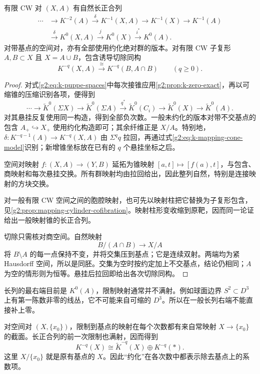 \begin{theorem}\label{g2:thm:k-long-exact}
	有限 CW 对 \((X,A)\) 有自然长正合列
	\begin{equation}\label{g2:eq:k-long-exact}
	\begin{aligned}
		\cdots&\longrightarrow K^{-2}(A)\xrightarrow{\delta}K^{-1}(X,A)
		\longrightarrow K^{-1}(X)\longrightarrow K^{-1}(A)\\
		&\xrightarrow{\delta}K^0(X,A)\xrightarrow{j}K^0(X)
		\xrightarrow{i^*}K^0(A).
	\end{aligned}
	\end{equation}
	对带基点的空间对，亦有全部使用约化绝对群的版本。对有限 CW 子复形 \(A,B\subset X\) 且 \(X=A\cup B\)，包含诱导切除同构
	\[
		K^{-q}(X,A)\xrightarrow{\ \cong\ }K^{-q}(B,A\cap B)
		\qquad(q\ge0).
	\]
\end{theorem}
\begin{proof}
	对式\eqref{g2:eq:k-puppe-spaces}中每次接锥应用\cref{g2:prop:k-zero-exact}，再以可缩锥的压缩识别各项，便得到
	\[
		\cdots\longrightarrow\widetilde K^0(\Sigma X)
		\longrightarrow\widetilde K^0(\Sigma A)
		\xrightarrow{q^*}\widetilde K^0(C_i)
		\longrightarrow\widetilde K^0(X)\longrightarrow\widetilde K^0(A).
	\]
	对其悬挂反复使用同一构造，得到全部负次数。一般未约化的版本对带不交基点的包含 \(A_+\hookrightarrow X_+\) 使用约化构造即可；其余纤维正是 \(X/A\)。特别地，\(\delta:K^{-q-1}(A)\to K^{-q}(X,A)\) 由 \(\Sigma^q q\) 拉回，再通过式\eqref{g2:eq:k-mapping-cone-model}识别；新增锥坐标放在已有的 \(q\) 个悬挂坐标之后。

	空间对映射 \(f:(X,A)\to(Y,B)\) 延拓为锥映射 \([a,t]\mapsto[f(a),t]\)，与包含、商映射和每次悬挂交换。所有群映射均由拉回给出，因此整列自然，特别是连接映射的方块交换。

	对一般有限 CW 空间之间的胞腔映射，也可先以映射柱把它替换为子复形包含，见\cref{g2:prop:mapping-cylinder-cofibration}。映射柱形变收缩到原靶，因而同一论证给出一般映射锥的长正合列。

	切除只需核对商空间。自然映射
	\[
		B/(A\cap B)\longrightarrow X/A
	\]
	将 \(B\setminus A\) 的每一点保持不变，并将交集压到基点；它是连续双射。两端均为紧 Hausdorff 空间，所以是同胚。交集为空时按约定加上不交基点，结论仍相同；\(A\) 为空的情形则为恒等。悬挂后拉回即给出各次切除同构。
\end{proof}

长列的最右端目前是 \(K^0(A)\)，限制映射通常并不满射。例如球面边界 \(S^2\subset D^3\) 上有第一陈数非零的线丛，它不可能来自可缩的 \(D^3\)。所以在一般长列右端不能直接补上零。

对空间对 \((X,\{x_0\})\)，限制到基点的映射在每个次数都有来自常映射 \(X\to\{x_0\}\) 的截面。长正合列的前一次限制也满射，因而得到
\[
	K^{-q}(X)\cong\widetilde K^{-q}(X)\oplus K^{-q}(*).
\]
这里 \(X/\{x_0\}\) 就是原有基点的 \(X\)。因此“约化”在各次数中都表示除去基点上的系数项。

